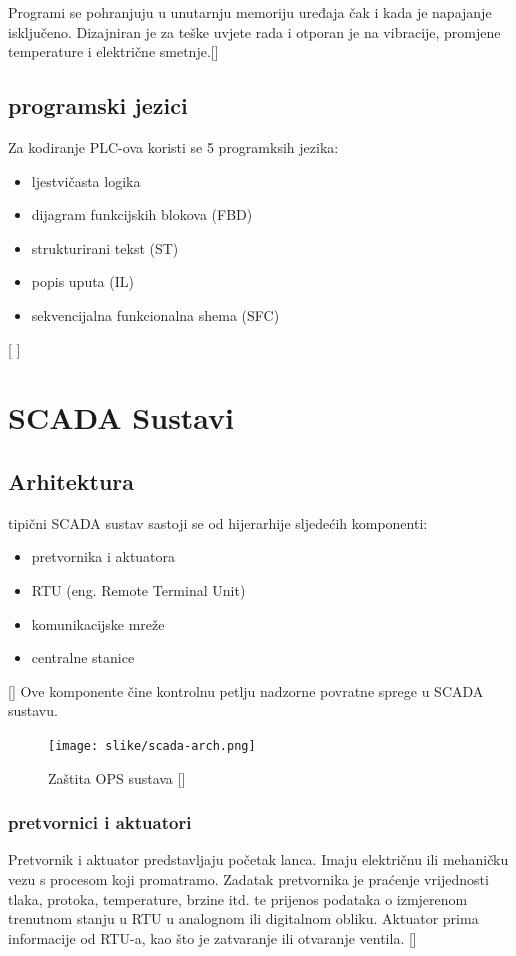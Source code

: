\documentclass[times, utf8, zavrsni]{fer}
\begin{document}
Programi se pohranjuju u unutarnju memoriju uređaja čak i kada je napajanje isključeno. Dizajniran je za teške uvjete rada i otporan je na vibracije, promjene temperature i električne smetnje.[\cite{plc2}]
\subsection{programski jezici}
Za kodiranje PLC-ova koristi se 5 programksih jezika:
\begin{itemize}
\item{ljestvičasta logika}
\item{dijagram funkcijskih blokova (FBD)}
\item{strukturirani tekst (ST)}
\item{popis uputa (IL)}
\item{sekvencijalna funkcionalna shema (SFC)}
\end{itemize} [ \cite{plc}]

\section{SCADA Sustavi}

\subsection{Arhitektura}
tipični SCADA sustav sastoji se od hijerarhije sljedećih komponenti:
\begin{itemize}
\item{pretvornika i aktuatora}
\item{RTU (eng. Remote Terminal Unit)}
\item{komunikacijske mreže}
\item{centralne stanice}
\end{itemize} [\cite{scada-arh}]
Ove komponente čine kontrolnu petlju nadzorne povratne sprege u SCADA sustavu.
\begin{figure}[htb]
\centering
\texttt{[image: slike/scada-arch.png]}
\caption{Zaštita OPS sustava  [\cite{scada-thesis2}]}
\label{fig:scada-arch}
\end{figure}


\subsubsection{pretvornici i aktuatori}
Pretvornik i aktuator predstavljaju početak lanca. Imaju električnu ili mehaničku vezu s procesom koji promatramo. Zadatak pretvornika je praćenje vrijednosti tlaka, protoka, temperature, brzine itd. te prijenos podataka o izmjerenom trenutnom stanju u RTU u analognom ili digitalnom obliku. Aktuator prima informacije od RTU-a, kao što je zatvaranje ili otvaranje ventila.
[\cite{scada-thesis}]
\end{document}
